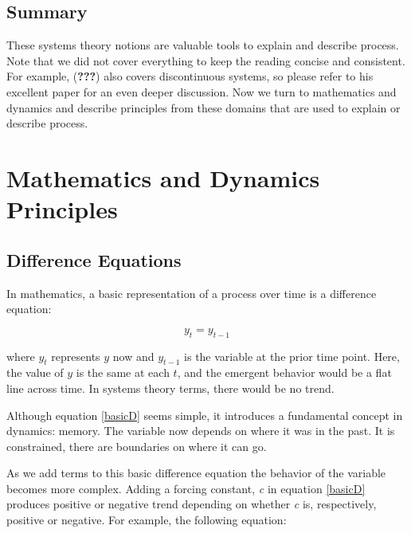 \documentclass[english,,man]{apa6}
\theoremstyle{definition}
\theoremstyle{definition}
\theoremstyle{definition}
\theoremstyle{remark}
\begin{document}
\hypertarget{summary-2}{%
\subsection{Summary}\label{summary-2}}

These systems theory notions are valuable tools to explain and describe
process. Note that we did not cover everything to keep the reading
concise and consistent. For example, ({\textbf{???}}) also covers
discontinuous systems, so please refer to his excellent paper for an
even deeper discussion. Now we turn to mathematics and dynamics and
describe principles from these domains that are used to explain or
describe process.

\hypertarget{mathematics-and-dynamics-principles}{%
\section{Mathematics and Dynamics
Principles}\label{mathematics-and-dynamics-principles}}

\hypertarget{difference-equations}{%
\subsection{Difference Equations}\label{difference-equations}}

In mathematics, a basic representation of a process over time is a
difference equation:

\begin{equation}
\label{basicD}
y_{t} = y_{t - 1}
\end{equation}

\noindent where \(y_{t}\) represents \(y\) now and \(y_{t-1}\) is the
variable at the prior time point. Here, the value of \(y\) is the same
at each \(t\), and the emergent behavior would be a flat line across
time. In systems theory terms, there would be no trend.

Although equation \ref{basicD} seems simple, it introduces a fundamental
concept in dynamics: memory. The variable now depends on where it was in
the past. It is constrained, there are boundaries on where it can go.

As we add terms to this basic difference equation the behavior of the
variable becomes more complex. Adding a forcing constant, \emph{c} in
equation \ref{basicD} produces positive or negative trend depending on
whether \emph{c} is, respectively, positive or negative. For example,
the following equation:
\end{document}
